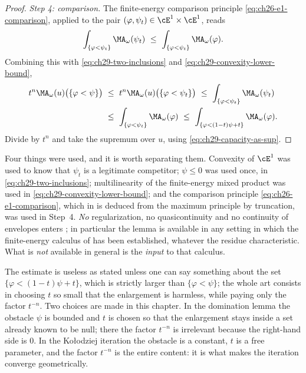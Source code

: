 \begin{proof}
\emph{Step 4: comparison.}  The finite-energy comparison principle
\eqref{eq:ch26-e1-comparison}, applied to the pair
\((\varphi,\psi_t)\in\cE^1\times\cE^1\), reads
\[
 \int_{\{\varphi<\psi_t\}}\MA_\omega(\psi_t)
 \ \leq\ \int_{\{\varphi<\psi_t\}}\MA_\omega(\varphi).
\]
Combining this with \eqref{eq:ch29-two-inclusions} and
\eqref{eq:ch29-convexity-lower-bound},
\[
\begin{aligned}
 t^n\MA_\omega(u)\bigl(\{\varphi<\psi\}\bigr)
 &\ \leq\ t^n\MA_\omega(u)\bigl(\{\varphi<\psi_t\}\bigr)
  \ \leq\ \int_{\{\varphi<\psi_t\}}\MA_\omega(\psi_t)\\
 &\ \leq\ \int_{\{\varphi<\psi_t\}}\MA_\omega(\varphi)
  \ \leq\ \int_{\{\varphi<(1-t)\psi+t\}}\MA_\omega(\varphi).
\end{aligned}
\]
Divide by \(t^n\) and take the supremum over \(u\), using
\eqref{eq:ch29-capacity-as-sup}.
\end{proof}

\begin{remark}
\label{rem:ch29-sublevel-hypotheses}
Four things were used, and it is worth separating them.  Convexity of
\(\cE^1\) was used to know that \(\psi_t\) is a legitimate competitor;
\(\psi\leq0\) was used once, in \eqref{eq:ch29-two-inclusions};
multilinearity of the finite-energy mixed product was used in
\eqref{eq:ch29-convexity-lower-bound}; and the comparison principle
\eqref{eq:ch26-e1-comparison}, which in  is deduced
from the maximum principle  by
truncation, was used in Step~4.  \emph{No} regularization, no
quasicontinuity and no continuity of envelopes enters
; in particular the lemma is available in
any setting in which the finite-energy calculus of 
has been established, whatever the residue characteristic.  What is
\emph{not} available in general is the \emph{input} to that calculus.
\end{remark}

\begin{remark}
\label{rem:ch29-shape-of-rhs}
The estimate is useless as stated unless one can say something about the set
\(\{\varphi<(1-t)\psi+t\}\), which is strictly larger than
\(\{\varphi<\psi\}\); the whole art consists in choosing \(t\) so small that
the enlargement is harmless, while paying only the factor \(t^{-n}\).  Two
choices are made in this chapter.  In the domination lemma
 the obstacle \(\psi\) is bounded and
\(t\) is chosen so that the enlargement stays inside a set already known to
be null; there the factor \(t^{-n}\) is irrelevant because the right-hand
side is \(0\).  In the Ko\l odziej iteration
 the obstacle is a constant, \(t\) is a free
parameter, and the factor \(t^{-n}\) is the entire content: it is what makes
the iteration converge geometrically.
\end{remark}

